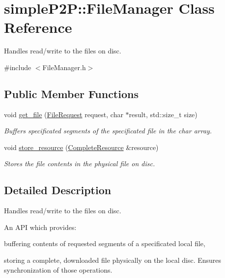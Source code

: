 \hypertarget{classsimpleP2P_1_1FileManager}{}\section{simple\+P2P\+:\+:File\+Manager Class Reference}
\label{classsimpleP2P_1_1FileManager}


Handles read/write to the files on disc.  




{\ttfamily \#include $<$File\+Manager.\+h$>$}

\subsection*{Public Member Functions}
\begin{DoxyCompactItemize}
\item 
void \hyperlink{classsimpleP2P_1_1FileManager_a5b2908521d2e91da96f46f7244f1322a}{get\+\_\+file} (\hyperlink{classsimpleP2P_1_1FileRequest}{File\+Request} request, char $\ast$result, std\+::size\+\_\+t size)
\begin{DoxyCompactList}\small\item\em Buffers specificated segments of the specificated file in the char array. \end{DoxyCompactList}\item 
void \hyperlink{classsimpleP2P_1_1FileManager_a66b3f14265b13cf21faab2c3605185dc}{store\+\_\+resource} (\hyperlink{classsimpleP2P_1_1CompleteResource}{Complete\+Resource} \&resource)
\begin{DoxyCompactList}\small\item\em Stores the file contents in the physical file on disc. \end{DoxyCompactList}\end{DoxyCompactItemize}


\subsection{Detailed Description}
Handles read/write to the files on disc. 

An A\+PI which provides\+:
\begin{DoxyItemize}
\item buffering contents of requested segments of a specificated local file,
\item storing a complete, downloaded file physically on the local disc. Ensures synchronization of those operations. 
\end{DoxyItemize}

